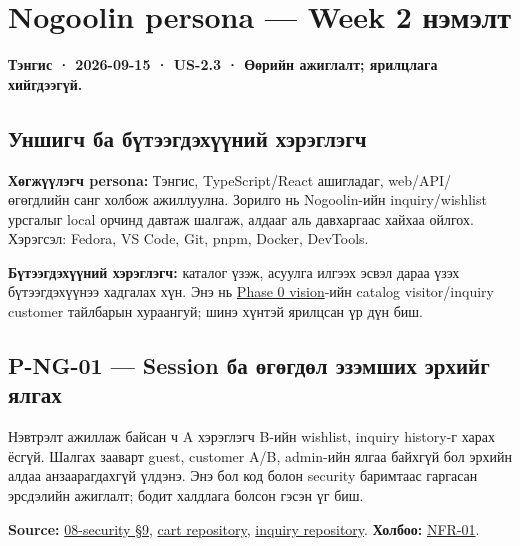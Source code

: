 \section{Nogoolin persona --- Week 2
нэмэлт}\label{doc2-nogoolin-persona-week-2-ux43dux44dux43cux44dux43bux442}

\textbf{Тэнгис · 2026-09-15 · US-2.3 · Өөрийн ажиглалт; ярилцлага
хийгдээгүй.}

\subsection{Уншигч ба бүтээгдэхүүний
хэрэглэгч}\label{doc2-ux443ux43dux448ux438ux433ux447-ux431ux430-ux431ux4afux442ux44dux44dux433ux434ux44dux445ux4afux4afux43dux438ux439-ux445ux44dux440ux44dux433ux43bux44dux433ux447}

\textbf{Хөгжүүлэгч persona:} Тэнгис, TypeScript/React ашигладаг,
web/API/өгөгдлийн санг холбож ажиллуулна. Зорилго нь Nogoolin-ийн
inquiry/wishlist урсгалыг local орчинд давтаж шалгаж, алдааг аль
давхаргаас хайхаа ойлгох. Хэрэгсэл: Fedora, VS Code, Git, pnpm, Docker,
DevTools.

\textbf{Бүтээгдэхүүний хэрэглэгч:} каталог үзэж, асуулга илгээх эсвэл
дараа үзэх бүтээгдэхүүнээ хадгалах хүн. Энэ нь
\href{../../phase-0/01-vision.md}{Phase 0 vision}-ийн catalog
visitor/inquiry customer тайлбарын хураангуй; шинэ хүнтэй ярилцсан үр
дүн биш.

\subsection{P-NG-01 --- Session ба өгөгдөл эзэмших эрхийг
ялгах}\label{doc2-p-ng-01-session-ux431ux430-ux4e9ux433ux4e9ux433ux434ux4e9ux43b-ux44dux437ux44dux43cux448ux438ux445-ux44dux440ux445ux438ux439ux433-ux44fux43bux433ux430ux445}

Нэвтрэлт ажиллаж байсан ч A хэрэглэгч B-ийн wishlist, inquiry history-г
харах ёсгүй. Шалгах зааварт guest, customer A/B, admin-ийн ялгаа байхгүй
бол эрхийн алдаа анзаарагдахгүй үлдэнэ. Энэ бол код болон security
баримтаас гаргасан эрсдэлийн ажиглалт; бодит халдлага болсон гэсэн үг
биш.

\textbf{Source:}
\href{../../phase-0/08-security.md\#9-idor-prevention}{08-security §9},
\href{../../../backend/api/src/repositories/supabase/cart.repository.ts}{cart
repository},
\href{../../../backend/api/src/repositories/supabase/inquiry.repository.ts}{inquiry
repository}. \textbf{Холбоо:}
\href{../../requirements/requirements.md\#nfr-01}{NFR-01}.


